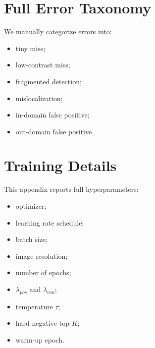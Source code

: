 \documentclass[conference,a4paper]{IEEEtran}
\begin{document}
\section{Full Error Taxonomy}
\label{app:error_taxonomy}

We manually categorize errors into:
\begin{itemize}
    \item tiny miss;
    \item low-contrast miss;
    \item fragmented detection;
    \item mislocalization;
    \item in-domain false positive;
    \item out-domain false positive.
\end{itemize}

\begin{table}[!htbp]
\centering
\caption{Error taxonomy used for qualitative analysis.}
\label{tab:error_taxonomy}
\end{table}

\section{Training Details}
\label{app:training_details}

This appendix reports full hyperparameters:
\begin{itemize}
    \item optimizer;
    \item learning rate schedule;
    \item batch size;
    \item image resolution;
    \item number of epochs;
    \item $\lambda_{pos}$ and $\lambda_{con}$;
    \item temperature $\tau$;
    \item hard-negative top-$K$;
    \item warm-up epoch.
\end{itemize}
\end{document}
